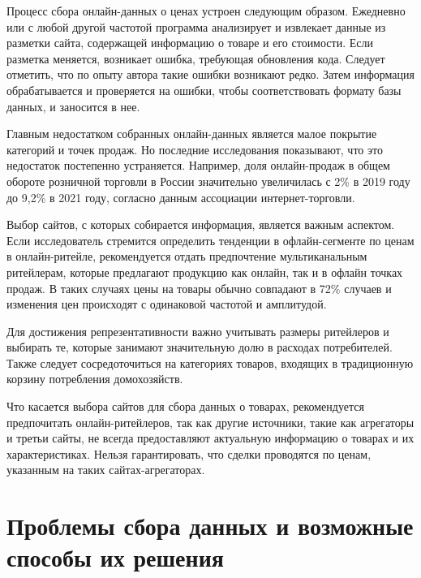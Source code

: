 Процесс сбора онлайн-данных о ценах устроен следующим образом. Ежедневно или с любой другой частотой программа анализирует и извлекает данные из разметки сайта, содержащей информацию о товаре и его стоимости. Если разметка меняется, возникает ошибка, требующая обновления кода. Следует отметить, что по опыту автора такие ошибки возникают редко. Затем информация обрабатывается и проверяется на ошибки, чтобы соответствовать формату базы данных, и заносится в нее.

Главным недостатком собранных онлайн-данных является малое покрытие категорий и точек продаж. Но последние исследования показывают, что это недостаток постепенно устраняется. Например, доля онлайн-продаж в общем обороте розничной торговли в России значительно увеличилась с 2\% в 2019 году до 9,2\% в 2021 году, согласно данным ассоциации интернет-торговли.

Выбор сайтов, с которых собирается информация, является важным аспектом. Если исследователь стремится определить тенденции в офлайн-сегменте по ценам в онлайн-ритейле, рекомендуется отдать предпочтение мультиканальным ритейлерам, которые предлагают продукцию как онлайн, так и в офлайн точках продаж. В таких случаях цены на товары обычно совпадают в 72\% случаев и изменения цен происходят с одинаковой частотой и амплитудой.

Для достижения репрезентативности важно учитывать размеры ритейлеров и выбирать те, которые занимают значительную долю в расходах потребителей. Также следует сосредоточиться на категориях товаров, входящих в традиционную корзину потребления домохозяйств.

Что касается выбора сайтов для сбора данных о товарах, рекомендуется предпочитать онлайн-ритейлеров, так как другие источники, такие как агрегаторы и третьи сайты, не всегда предоставляют актуальную информацию о товарах и их характеристиках. Нельзя гарантировать, что сделки проводятся по ценам, указанным на таких сайтах-агрегаторах.

\section{Проблемы сбора данных и возможные способы их решения}\label{sec:ch2/sec2}
